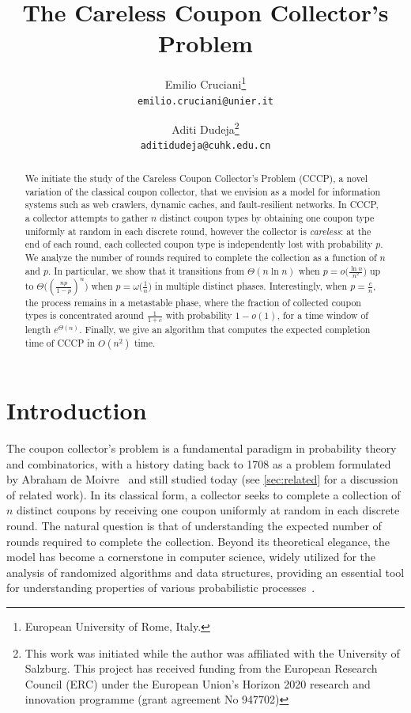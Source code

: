 \documentclass[11pt,a4paper]{article}
\title{The Careless Coupon Collector's Problem}
\author{Emilio Cruciani\thanks{European University of Rome, Italy.}\\\texttt{emilio.cruciani@unier.it} \and Aditi Dudeja\thanks{This work was initiated while the author was affiliated with the University of Salzburg. This project has received funding from the European Research Council (ERC) under the European Union’s Horizon 2020 research and innovation programme (grant agreement No 947702)}\\ \texttt{aditidudeja@cuhk.edu.cn}}
\date{}
\begin{document}
\maketitle

\begin{abstract}
We initiate the study of the Careless Coupon Collector's Problem (CCCP), a novel variation of the classical coupon collector, that we envision as a model for information systems such as web crawlers, dynamic caches, and fault-resilient networks.
In CCCP, a collector attempts to gather $n$ distinct coupon types by obtaining one coupon type uniformly at random in each discrete round, however the collector is \textit{careless}: at the end of each round, each collected coupon type is independently lost with probability $p$.
We analyze the number of rounds required to complete the collection as a function of $n$ and $p$. 
In particular, we show that it transitions from $\Theta(n \ln n)$ when $p = o\big(\frac{\ln n}{n^2}\big)$ up to $\Theta\big((\frac{np}{1-p})^n\big)$ when $p=\omega\big(\frac{1}{n}\big)$ in multiple distinct phases.
Interestingly, when $p=\frac{c}{n}$, the process remains in a metastable phase, where the fraction of collected coupon types is concentrated around $\frac{1}{1+c}$ with probability $1-o(1)$, for a time window of length $e^{\Theta(n)}$.
Finally, we give an algorithm that computes the expected completion time of CCCP in $O(n^2)$ time.
\end{abstract}


\section{Introduction}
The coupon collector's problem is a fundamental paradigm in probability theory and combinatorics, with a history dating back to 1708 as a problem formulated by Abraham de Moivre~\cite{ferrante2014coupon} and still studied today (see \cref{sec:related} for a discussion of related work).
In its classical form, a collector seeks to complete a collection of $n$ distinct coupons by receiving one coupon uniformly at random in each discrete round. 
The natural question is that of understanding the expected number of rounds required to complete the collection.
Beyond its theoretical elegance, the model has become a cornerstone in computer science, widely utilized for the analysis of randomized algorithms and data structures, providing an essential tool for understanding properties of various probabilistic processes~\cite{raghavan1995randomized,mitzenmacher2017probability}.
\end{document}
